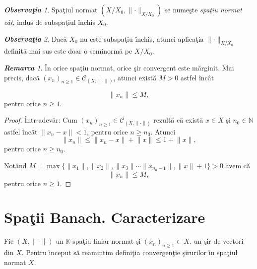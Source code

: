 \documentclass[ a4paper, 12pt]{report}
\theoremstyle{remark}
\newtheorem{remarc}{\bf Remarca}[section]
\newtheorem{obs}{\bf Observa\c tia }[section]
\numberwithin{equation}{section}
\begin{document}
\begin{obs}
Spa\c tiul normat $\left(  X/X_0, \lVert \cdot \rVert_{X/X_0} \right)$ se nume\c ste \emph{spa\c tiu normat c\^at}, indus de subspa\c tiul \^inchis $X_0$.
\end{obs}
\begin{obs}
Dac\u a $X_0$ nu este subspa\c tiu \^inchis, atunci aplica\c tia $\lVert \cdot \rVert_{X/X_0}$ definit\u a mai sus este doar o seminorm\u a pe $X/X_0.$
\end{obs}
\begin{remarc}
\^In orice spa\c tiu normat, orice \c sir convergent este m\u arginit. Mai precis,  dac\u a $(x_n)_{n \geq 1} \in \mathcal{C}_{(X, \lVert \cdot \rVert)}$,  atunci exist\u a $ M>0$ astfel \^inc\^at 

$$\lVert x_n \rVert \leq M,$$ pentru orice $ n \geq 1.$
\end{remarc}

\begin{proof}
\^Intr-adev\u ar: Cum $(x_n)_{n \geq 1} \in \mathcal{C}_{(X, \lVert \cdot \rVert)}$ rezult\u a c\u a exist\u a  $x \in X$ \c si $n_0 \in \mathbb{N}$ astfel \^inc\^at $\lVert x_n - x \rVert <1$, pentru orice  $n \geq n_0$. Atunci
$$ \lVert x_n \rVert \leq \lVert x_n - x \rVert +  \lVert x \rVert \leq 1 +  \lVert x \rVert,$$ pentru orice $ n \geq n_0.$

Not\^and $M = \max\{ \lVert x_1 \rVert, \lVert x_2 \rVert, \lVert x_3 \rVert \cdots \lVert x_{n_{0} -1} \rVert, \lVert x \rVert +1 \} >0$ avem c\u a
 $$\lVert x_n \rVert \leq M,$$ pentru orice $ n \geq 1.$
\end{proof}




\newpage


\section{Spa\c tii Banach. Caracterizare}

\vspace{1cm}

Fie $(X, \lVert \cdot \rVert)$ un $\mathbb{K}$-spa\c tiu  liniar normat \c si $(x_n)_{n \geq 1} \subset X.$ un \c sir de vectori din $X$. Pentru \^\i nceput s\u a reamintim defini\c tia convergen\c tie \c sirurilor \^\i n spa\c tiul normat $X$.
\end{document}

